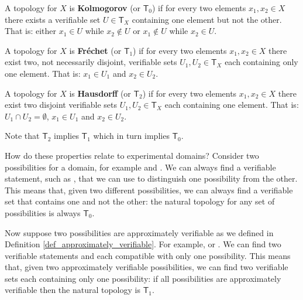 \documentclass[11pt,letterpaper,fleqn]{memoir} %
\begin{document}
\begin{mathSection}
	\begin{defn}
		A topology for $X$ is \textbf{Kolmogorov} (or $\mathsf{T}_0$) if for every two elements $x_1, x_2 \in X$ there exists a verifiable set $U \in \mathsf{T}_X$ containing one element but not the other. That is: either $x_1 \in U$ while $x_2 \notin U$ or $x_1 \notin U$ while $x_2 \in U$.
	\end{defn}
	\begin{defn}
	A topology for $X$ is \textbf{Fr\'echet} (or $\mathsf{T}_1$) if for every two elements $x_1, x_2 \in X$ there exist two, not necessarily disjoint, verifiable sets $U_1, U_2 \in \mathsf{T}_X$ each containing only one element. That is: $x_1 
	\in U_1$ and $x_2 \in U_2$.
\end{defn}
	\begin{defn}
	A topology for $X$ is \textbf{Hausdorff} (or $\mathsf{T}_2$) if for every two elements $x_1, x_2 \in X$ there exist two disjoint verifiable sets $U_1, U_2 \in \mathsf{T}_X$ each containing one element. That is: $U_1 \cap U_2 = \emptyset$, $x_1 
	\in U_1$ and $x_2 \in U_2$.
\end{defn}
\begin{remark}
	Note that $\mathsf{T}_2$ implies $\mathsf{T}_1$ which in turn implies $\mathsf{T}_0$.
\end{remark}

\end{mathSection}

How do these properties relate to experimental domains? Consider two possibilities for a domain, for example  and . We can always find a verifiable statement, such as , that we can use to distinguish one possibility from the other. This means that, given two different possibilities, we can always find a verifiable set that contains one and not the other: the natural topology for any set of possibilities is always $\mathsf{T}_0$.

Now suppose two possibilities are approximately verifiable as we defined in Definition \ref{def_approximately_verifiable}. For example,  or . We can find two verifiable statements  and  each compatible with only one possibility. This means that, given two approximately verifiable possibilities, we can find two verifiable sets each containing only one possibility: if all possibilities are approximately verifiable then the natural topology is $\mathsf{T}_1$.
\end{document}
